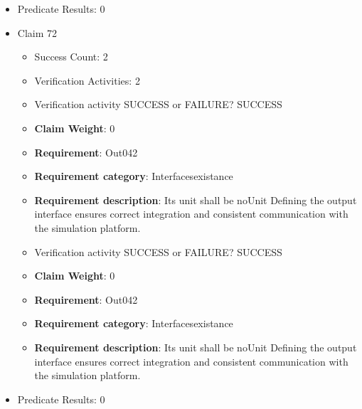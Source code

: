 \documentclass{article}
\begin{document}
\begin{itemize}
\begin{itemize}
					\item Verification activity SUCCESS or FAILURE? SUCCESS
					\item \textbf{Claim Weight}: 0
						\item \textbf{Requirement}: Out041 
						\item \textbf{Requirement category}: Interfacesexistance 
						\item \textbf{Requirement description}: Its unit shall be Nm Defining the output interface ensures correct integration and consistent communication with the simulation platform.
					
				\end{itemize}
				
									    
				\item Predicate Results: 0

  				  \item Claim 72
				\begin{itemize}
			    	\item Success Count: 2 
			    	\item Verification Activities: 2
					\item Verification activity SUCCESS or FAILURE? SUCCESS
					\item \textbf{Claim Weight}: 0
						\item \textbf{Requirement}: Out042 
						\item \textbf{Requirement category}: Interfacesexistance 
						\item \textbf{Requirement description}: Its unit shall be noUnit Defining the output interface ensures correct integration and consistent communication with the simulation platform.
					
					\item Verification activity SUCCESS or FAILURE? SUCCESS
					\item \textbf{Claim Weight}: 0
						\item \textbf{Requirement}: Out042 
						\item \textbf{Requirement category}: Interfacesexistance 
						\item \textbf{Requirement description}: Its unit shall be noUnit Defining the output interface ensures correct integration and consistent communication with the simulation platform.
					
				\end{itemize}
				
									    
				\item Predicate Results: 0


\end{itemize}
\end{document}
